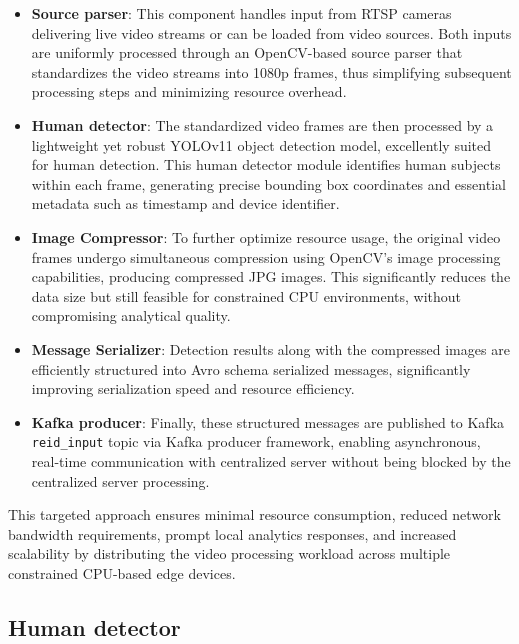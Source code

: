 \begin{itemize}
    \item \textbf{Source parser}: This component handles input from RTSP cameras delivering live video streams or can be loaded from video sources. Both inputs are uniformly processed through an OpenCV-based source parser that standardizes the video streams into 1080p frames, thus simplifying subsequent processing steps and minimizing resource overhead.
    
    \item \textbf{Human detector}: The standardized video frames are then processed by a lightweight yet robust YOLOv11 object detection model, excellently suited for human detection. This human detector module identifies human subjects within each frame, generating precise bounding box coordinates and essential metadata such as timestamp and device identifier.
    
    \item \textbf{Image Compressor}: To further optimize resource usage, the original video frames undergo simultaneous compression using OpenCV's image processing capabilities, producing compressed JPG images. This significantly reduces the data size but still feasible for constrained CPU environments, without compromising analytical quality.
    
    \item \textbf{Message Serializer}: Detection results along with the compressed images are efficiently structured into Avro schema serialized messages, significantly improving serialization speed and resource efficiency.
    
    \item \textbf{Kafka producer}: Finally, these structured messages are published to Kafka \texttt{reid\_input} topic via Kafka producer framework, enabling asynchronous, real-time communication with centralized server without being blocked by the centralized server processing.
\end{itemize}



This targeted approach ensures minimal resource consumption, reduced network bandwidth requirements, prompt local analytics responses, and increased scalability by distributing the video processing workload across multiple constrained CPU-based edge devices.

\subsection{Human detector}
\label{sec:edge_human_detection}

